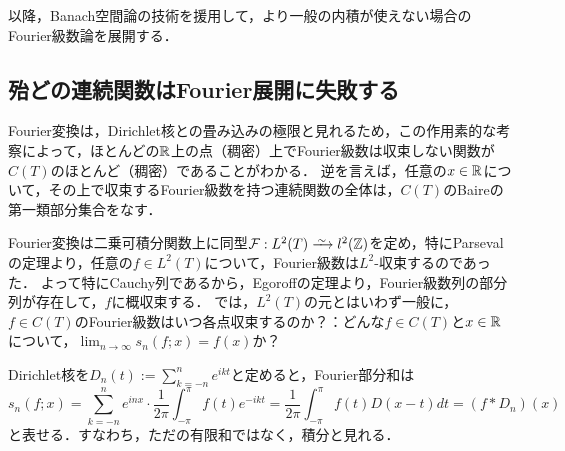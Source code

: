 \documentclass[uplatex,dvipdfmx]{jsreport}
\begin{document}
\begin{tcolorbox}[colframe=ForestGreen, colback=ForestGreen!10!white,breakable,colbacktitle=ForestGreen!40!white,coltitle=black,fonttitle=\bfseries\sffamily,
title=連続関数のFourier級数が各点収束するための条件を探す]
以降，Banach空間論の技術を援用して，より一般の内積が使えない場合のFourier級数論を展開する．
\end{tcolorbox}

\subsection{殆どの連続関数はFourier展開に失敗する}

\begin{tcolorbox}[colframe=ForestGreen, colback=ForestGreen!10!white,breakable,colbacktitle=ForestGreen!40!white,coltitle=black,fonttitle=\bfseries\sffamily,
title=]
    Fourier変換は，Dirichlet核との畳み込みの極限と見れるため，この作用素的な考察によって，ほとんどの$\mathbb{R}$上の点（稠密）上でFourier級数は収束しない関数が$C(T)$のほとんど（稠密）であることがわかる．
    逆を言えば，任意の$x\in\mathbb{R}$について，その上で収束するFourier級数を持つ連続関数の全体は，$C(T)$のBaireの第一類部分集合をなす．
\end{tcolorbox}

\begin{problem}
    Fourier変換は二乗可積分関数上に同型$\F:L^2(T)\iso l^2(\Z)$を定め，特にParsevalの定理より，任意の$f\in L^2(T)$について，Fourier級数は$L^2$-収束するのであった．
    よって特にCauchy列であるから，Egoroffの定理より，Fourier級数列の部分列が存在して，$f$に概収束する．
    では，$L^2(T)$の元とはいわず一般に，$f\in C(T)$のFourier級数はいつ各点収束するのか？：どんな$f\in C(T)$と$x\in\mathbb{R}$について，$\lim_{n\to\infty}s_n(f;x)=f(x)$か？
\end{problem}

\begin{definition}
    Dirichlet核を$D_n(t):=\sum^n_{k=-n}e^{ikt}$と定めると，Fourier部分和は
    \[s_n(f;x)=\sum_{k=-n}^ne^{inx}\cdot\frac{1}{2\pi}\int^\pi_{-\pi}f(t)e^{-ikt}=\frac{1}{2\pi}\int^\pi_{-\pi}f(t)D(x-t)dt=(f*D_n)(x)\]
    と表せる．すなわち，ただの有限和ではなく，積分と見れる．
\end{definition}
\end{document}

